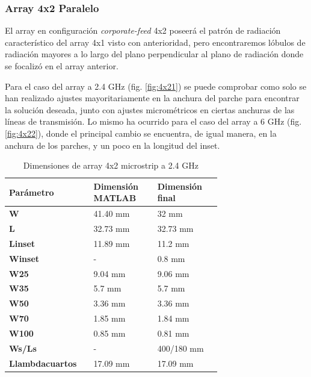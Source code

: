 \subsubsection{Array 4x2 Paralelo} 
\par El array en configuración \textit{corporate-feed} 4x2 poseerá el patrón de radiación característico del array 4x1 visto con anterioridad, pero encontraremos lóbulos de radiación mayores a lo largo del plano perpendicular al plano de radiación donde se focalizó en el array anterior. 
\\
\par Para el caso del array a 2.4 GHz (fig. \ref{fig:4x21}) se puede comprobar como solo se han realizado ajustes mayoritariamente en la anchura del parche para encontrar la solución deseada, junto con ajustes micrométricos en ciertas anchuras de las líneas de transmisión. Lo mismo ha ocurrido para el caso del array a 6 GHz (fig. \ref{fig:4x22}), donde el principal cambio se encuentra, de igual manera, en la anchura de los parches, y un poco en la longitud del inset.
\\
\begin{table}[H]
  

   \small %
   \centering %
   \begin{tabular}{m{0.2\linewidth}m{0.25\linewidth}m{0.25\linewidth}} %
   \toprule[\heavyrulewidth]\toprule[\heavyrulewidth]
   \textbf{Parámetro} & \textbf{Dimensión MATLAB} & \textbf{Dimensión final} \\ 
   \midrule
   \textbf{W} & 41.40 mm & 32 mm \\
   \textbf{L} & 32.73 mm & 32.73 mm\\
   \textbf{Linset} & 11.89 mm & 11.2 mm\\
   \textbf{Winset} & - & 0.8 mm\\
   \textbf{W25} & 9.04 mm & 9.06 mm\\
   \textbf{W35} & 5.7 mm & 5.7 mm\\
   \textbf{W50} & 3.36 mm & 3.36 mm\\
   \textbf{W70} & 1.85 mm & 1.84 mm\\
   \textbf{W100} & 0.85 mm & 0.81 mm\\
   \textbf{Ws/Ls} & - & 400/180 mm\\
   \textbf{Llambdacuartos} & 17.09 mm & 17.09 mm\\
   \bottomrule[\heavyrulewidth] 
   \end{tabular}
   \caption{Dimensiones de array 4x2 microstrip a 2.4 GHz} 
      \label{tab:array4x21}
\end{table}

